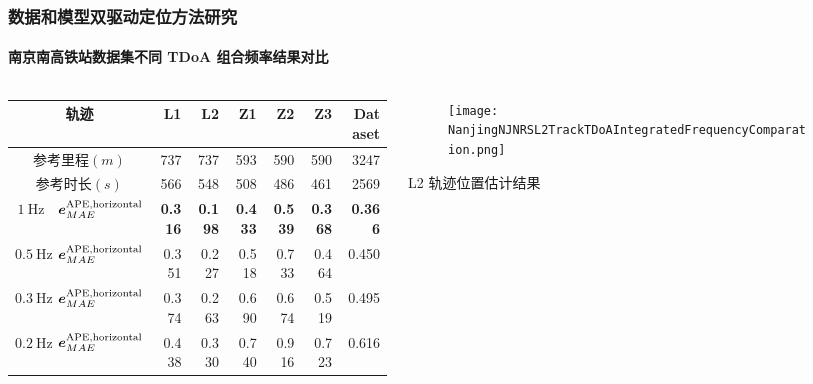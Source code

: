 \begin{frame}
 	\frametitle{数据和模型双驱动定位方法研究}
 	\framesubtitle{南京南高铁站数据集不同 TDoA 组合频率结果对比}
	\begin{columns}[t]
		\begin{column}{0.5\textwidth}
	    {
	    	\tiny
	    	\setlength{\tabcolsep}{2pt}
			\begin{tabular*}{\linewidth}{@{\extracolsep{\fill}}rlrrrrrr}
				\toprule
			    \multicolumn{2}{c}{轨迹} & L1 & L2 & Z1 & Z2 & Z3 & Dataset \\
				\midrule
				\multicolumn{2}{c}{参考里程$\left(\unit{m}\right)$} & 737 & 737 & 593 & 590 & 590 & 3247 \\
				\midrule
				\multicolumn{2}{c}{参考时长$\left(\unit{s}\right)$} & 566 & 548 & 508 & 486 & 461 & 2569 \\
				\midrule
				\multirow{1}{*}{$\SI{1}{\hertz}$}
				& $\vb*{e}^{\mathrm{APE,horizontal}}_{MAE}$ & \textbf{0.316} & \textbf{0.198} & \textbf{0.433} & \textbf{0.539} & \textbf{0.368} & \textbf{0.366} \\
				\midrule
				\multirow{1}{*}{$\SI{0.5}{\hertz}$}
				& $\vb*{e}^{\mathrm{APE,horizontal}}_{MAE}$ & 0.351 & 0.227 & 0.518 & 0.733 & 0.464 & 0.450 \\
				\midrule
				\multirow{1}{*}{$\SI{0.3}{\hertz}$}
				& $\vb*{e}^{\mathrm{APE,horizontal}}_{MAE}$ & 0.374 & 0.263 & 0.690 & 0.674 & 0.519 & 0.495 \\
				\midrule
				\multirow{1}{*}{$\SI{0.2}{\hertz}$}
				& $\vb*{e}^{\mathrm{APE,horizontal}}_{MAE}$ & 0.438 & 0.330 & 0.740 & 0.916 & 0.723 & 0.616 \\		
				\bottomrule 
			\end{tabular*}	
		}
		\end{column}   
		\begin{column}{0.5\textwidth}
		    \vspace{-2.5cm}
			\begin{columns}[t]
					\begin{column}{0.33\textwidth}
					   	\begin{figure}
						    \texttt{[image: NanjingNJNRSL2TrackTDoAIntegratedFrequencyComparation.png]}
					   	\end{figure}
					   	\vspace{-0.5cm}
		   			   	\hspace{0.0cm} {\tiny L2 轨迹位置估计结果}
					\end{column}   
					\begin{column}{0.33\textwidth}

\end{column}
\end{columns}
\end{column}
\end{columns}
\end{frame}
